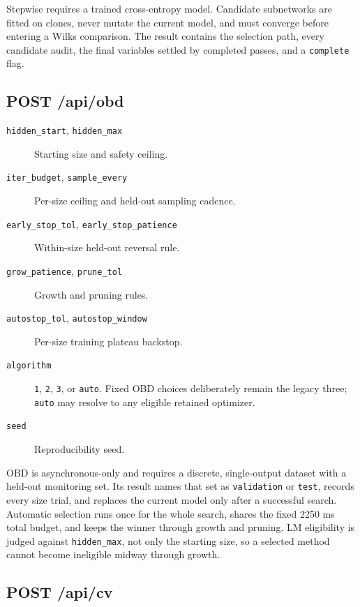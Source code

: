 Stepwise requires a trained cross-entropy model.  Candidate subnetworks
are fitted on clones, never mutate the current model, and must converge
before entering a Wilks comparison.  The result contains the selection
path, every candidate audit, the final variables settled by completed
passes, and a \texttt{complete} flag.

\subsection{POST /api/obd}

\begin{description}
\item[\texttt{hidden\_start}, \texttt{hidden\_max}] Starting size and
safety ceiling.
\item[\texttt{iter\_budget}, \texttt{sample\_every}] Per-size ceiling
and held-out sampling cadence.
\item[\texttt{early\_stop\_tol}, \texttt{early\_stop\_patience}]
Within-size held-out reversal rule.
\item[\texttt{grow\_patience}, \texttt{prune\_tol}] Growth and pruning
rules.
\item[\texttt{autostop\_tol}, \texttt{autostop\_window}] Per-size
training plateau backstop.
\item[\texttt{algorithm}] \texttt{1}, \texttt{2}, \texttt{3}, or
\texttt{auto}. Fixed OBD choices deliberately remain the legacy three;
\texttt{auto} may resolve to any eligible retained optimizer.
\item[\texttt{seed}] Reproducibility seed.
\end{description}

OBD is asynchronous-only and requires a discrete, single-output
dataset with a held-out monitoring set.  Its result names that set as
\texttt{validation} or \texttt{test}, records every size trial, and
replaces the current model only after a successful search.
Automatic selection runs once for the whole search, shares the fixed 2250 ms
total budget, and keeps the winner through growth and pruning. LM eligibility is
judged against \texttt{hidden\_max}, not only the starting size, so a selected
method cannot become ineligible midway through growth.

\subsection{POST /api/cv}


